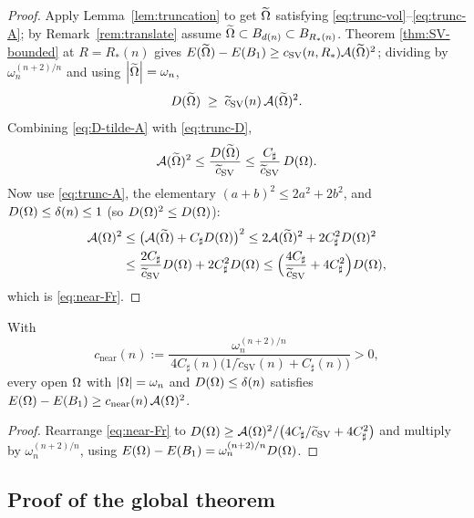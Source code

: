 \begin{proof}
Apply Lemma~\ref{lem:truncation} to get $\widetilde{\Omega}$ satisfying
\eqref{eq:trunc-vol}--\eqref{eq:trunc-A}; by Remark~\ref{rem:translate}
assume $\widetilde{\Omega}\subset B_{d(n)}\subset B_{R_*(n)}$. Theorem
\ref{thm:SV-bounded} at $R=R_*(n)$ gives
$E(\widetilde{\Omega})-E(B_1)\ge c_{\mathrm{SV}}(n,R_*)\mathcal A(\widetilde{\Omega})^2$; dividing by
$\omega_n^{(n+2)/n}$ and using $\left|\widetilde{\Omega}\right|=\omega_n$,
\begin{equation}\label{eq:D-tilde-A}
   D(\widetilde{\Omega})\;\ge\;\widetilde c_{\mathrm{SV}}(n)\,\mathcal A(\widetilde{\Omega})^2 .
\end{equation}
Combining \eqref{eq:D-tilde-A} with \eqref{eq:trunc-D},
\[
   \mathcal A(\widetilde{\Omega})^2\le\frac{D(\widetilde{\Omega})}{\widetilde c_{\mathrm{SV}}}
   \le\frac{C_\sharp}{\widetilde c_{\mathrm{SV}}}\,D(\Omega).
\]
Now use \eqref{eq:trunc-A}, the elementary
$(a+b)^2\le2a^2+2b^2$, and $D(\Omega)\le\delta(n)\le1$ (so
$D(\Omega)^2\le D(\Omega)$):
\begin{align*}
   \mathcal A(\Omega)^2
   &\le\bigl(\mathcal A(\widetilde{\Omega})+C_\sharp D(\Omega)\bigr)^2
    \le2\mathcal A(\widetilde{\Omega})^2+2C_\sharp^2D(\Omega)^2\\
   &\le\frac{2C_\sharp}{\widetilde c_{\mathrm{SV}}}D(\Omega)+2C_\sharp^2D(\Omega)
    \le\Bigl(\frac{4C_\sharp}{\widetilde c_{\mathrm{SV}}}+4C_\sharp^2\Bigr)D(\Omega),
\end{align*}
which is \eqref{eq:near-Fr}.
\end{proof}

\begin{corollary}\label{cor:near}
With
\begin{equation}\label{eq:cnear}
   c_{\mathrm{near}}(n):=
   \frac{\omega_n^{(n+2)/n}}
        {\,4C_\sharp(n)\bigl(1/\widetilde c_{\mathrm{SV}}(n)+C_\sharp(n)\bigr)}>0,
\end{equation}
every open $\Omega$ with $\left|\Omega\right|=\omega_n$ and $D(\Omega)\le\delta(n)$
satisfies $E(\Omega)-E(B_1)\ge c_{\mathrm{near}}(n)\,\mathcal A(\Omega)^2$.
\end{corollary}

\begin{proof}
Rearrange \eqref{eq:near-Fr} to
$D(\Omega)\ge\mathcal A(\Omega)^2/\bigl(4C_\sharp/\widetilde c_{\mathrm{SV}}
+4C_\sharp^2\bigr)$ and multiply by $\omega_n^{(n+2)/n}$, using
$E(\Omega)-E(B_1)=\omega_n^{(n+2)/n}D(\Omega)$.
\end{proof}

\subsection{Proof of the global theorem}\label{ssec:global-proof}

